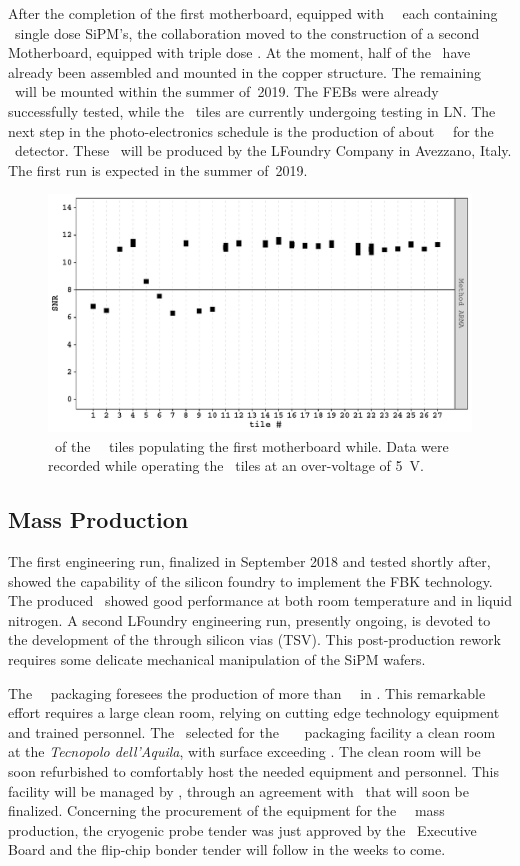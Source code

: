 After the completion of the first motherboard, equipped with \DSkSQBPdmsNumber\ \DSkPdms\ each containing  \DSkTileSiPMsCustomNumber\ single dose SiPM's, the collaboration moved to the construction of a second Motherboard, equipped with triple dose \SiPMs.   At the moment, half of the \DSkPdms\ have already been assembled and mounted in the copper structure. The remaining \DSkPdms\ will be mounted within the summer of~2019.  The FEBs were already successfully tested, while the \SiPM\ tiles are currently undergoing testing in LN. The next step in the photo-electronics schedule is the production of about  \DSkPdmsSecondBatchNumber\ \DSkPdms\ for the \DSps\ detector. These \SiPMs\ will be produced by the LFoundry Company in Avezzano, Italy.  The first run is expected in the summer of~2019. 

\begin{figure}[t!]
\includegraphics[width=0.5\columnwidth]{./Figures/SNR2.pdf}
\caption[\SNR\ of the \SiPMs\ tiles of the first motherboard]{\SNR\ of the \DSkSQBPdmsNumber\ \SiPM\ tiles populating the first motherboard while.  Data were recorded while operating the \SiPM\ tiles at an over-voltage of \SI{5}{\volt}.}
\label{fig:SNR2} 
\end{figure} 


\subsection{Mass Production}

The first engineering run, finalized in September 2018 and tested shortly after, showed the capability of the silicon foundry to implement the FBK technology.  The produced \SiPMs\ showed good performance at both room temperature and in liquid nitrogen. A second LFoundry engineering run, presently ongoing, is devoted to the development of the through silicon vias (TSV). This post-production rework requires some delicate mechanical manipulation of the SiPM wafers.

The \DSks\ \SiPM\ packaging foresees the production of more than \DSkPdmsNumberWithSpares\ \DSkPdms\ in \DSkPdmsContructionTime. This remarkable effort requires a large clean room, relying on cutting edge technology equipment and trained personnel.  The \GADMC\ selected for the \NOA\ \DSks\ \SiPM\ packaging facility a clean room at the {\it Tecnopolo dell'Aquila}, with surface exceeding \DSkPdmsCleanRoomSurface.  The clean room will be soon refurbished to comfortably host the needed equipment and personnel.  This facility will be managed by \GSSI, through an agreement with \INFN\ that will soon be finalized.  Concerning the procurement of the equipment for the \DSks\ \DSkPdms\ mass production, the cryogenic probe tender was just approved by the \INFN\ Executive Board and the flip-chip bonder tender will follow in the weeks to come.